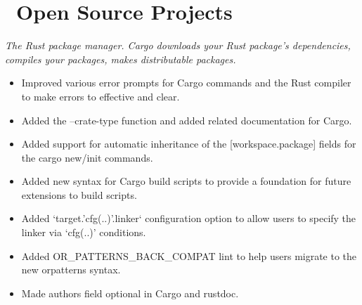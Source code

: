 \documentclass{software_engineer_rustin_liu}
\newcommand{\en}[1]{#1}
\newcommand{\zh}[1]{}
\begin{document}
\section{\faGithubAlt\ \en{Open Source Projects}\zh{开源项目}}
\en{}
\zh{\datedsubsection{\textbf{Cargo - 活跃贡献者}}{{\href{https://github.com/search?q=repo:rust-lang/cargo+repo:rust-lang/rust+author:hi-rustin&type=commits}{260+ commits}}}}
\en{\textsl{The Rust package manager. Cargo downloads your Rust package’s dependencies, compiles your packages, makes distributable packages.}}
\zh{\textsl{Rust 包管理器，Cargo 下载 Rust 包的依赖，编译包，制作可分发的包。}}

\begin{itemize}
      \item \en{Improved various error prompts for Cargo commands and the Rust compiler to make errors to effective and clear.}
            \zh{改善了大量 Cargo 命令和 Rust 编译器的错误提示，让错误更有效更清晰。}
      \item \en{Added the --crate-type function and added related documentation for Cargo.}
            \zh{为 Cargo 添加了 --crate-type 功能和相关文档。}
      \item \en{Added support for automatic inheritance of the [workspace.package] fields for the cargo new/init commands.}
            \zh{为 cargo new 和 cargo init 命令支持了 [workspace.package] 字段自动继承。}
      \item \en{Added new syntax for Cargo build scripts to provide a foundation for future extensions to build scripts.}
            \zh{为 Cargo 构建脚本添加新的语法，为未来扩展构建脚本提供基础。}
      \item \en{Added `target.'cfg(..)'.linker` configuration option to allow users to specify the linker via `cfg(..)' conditions.}
            \zh{添加了 `target.'cfg(..)'.linker` 配置项，允许用户通过 `cfg(..)' 条件来指定链接器。}
      \item \en{Added OR\_PATTERNS\_BACK\_COMPAT lint to help users migrate to the new or\-patterns syntax.}
            \zh{添加了 OR\_PATTERNS\_BACK\_COMPAT lint 来帮助用户迁移至新的 or\-patterns 语法。}
      \item \en{Made authors field optional in Cargo and rustdoc.}
            \zh{使 authors 字段在 Cargo 和 rustdoc 中可选。}
\end{itemize}
\end{document}
